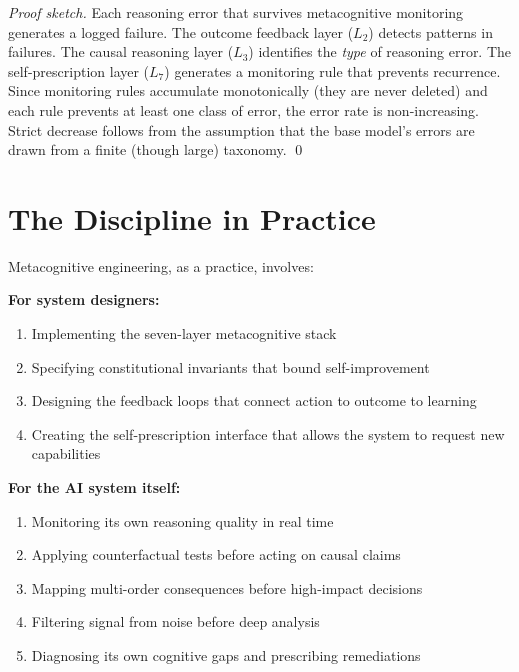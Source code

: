 \documentclass[12pt,a4paper]{article}
\theoremstyle{plain}
\theoremstyle{definition}
\theoremstyle{remark}
\begin{document}
\begin{proof}[Proof sketch]
Each reasoning error that survives metacognitive monitoring generates a logged failure. The outcome feedback layer ($L_2$) detects patterns in failures. The causal reasoning layer ($L_3$) identifies the \emph{type} of reasoning error. The self-prescription layer ($L_7$) generates a monitoring rule that prevents recurrence. Since monitoring rules accumulate monotonically (they are never deleted) and each rule prevents at least one class of error, the error rate is non-increasing. Strict decrease follows from the assumption that the base model's errors are drawn from a finite (though large) taxonomy. \qed
\end{proof}

\section{The Discipline in Practice}

Metacognitive engineering, as a practice, involves:

\textbf{For system designers:}
\begin{enumerate}[nosep]
\item Implementing the seven-layer metacognitive stack
\item Specifying constitutional invariants that bound self-improvement
\item Designing the feedback loops that connect action to outcome to learning
\item Creating the self-prescription interface that allows the system to request new capabilities
\end{enumerate}

\textbf{For the AI system itself:}
\begin{enumerate}[nosep]
\item Monitoring its own reasoning quality in real time
\item Applying counterfactual tests before acting on causal claims
\item Mapping multi-order consequences before high-impact decisions
\item Filtering signal from noise before deep analysis
\item Diagnosing its own cognitive gaps and prescribing remediations
\end{enumerate}
\end{document}
